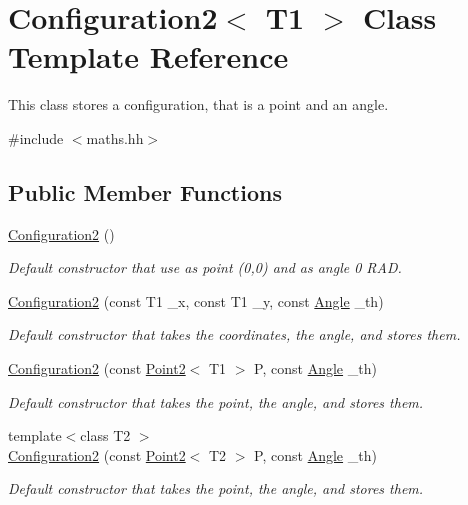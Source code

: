 \hypertarget{class_configuration2}{}\section{Configuration2$<$ T1 $>$ Class Template Reference}
\label{class_configuration2}


This class stores a configuration, that is a point and an angle.  




{\ttfamily \#include $<$maths.\+hh$>$}

\subsection*{Public Member Functions}
\begin{DoxyCompactItemize}
\item 
\mbox{\hyperlink{class_configuration2_a6fc5a5a723da700b6a869db09ec5614f}{Configuration2}} ()
\begin{DoxyCompactList}\small\item\em Default constructor that use as point (0,0) and as angle 0 R\+AD. \end{DoxyCompactList}\item 
\mbox{\hyperlink{class_configuration2_a09e73e9fe2ae9a67a037a0b3d0619047}{Configuration2}} (const T1 \+\_\+x, const T1 \+\_\+y, const \mbox{\hyperlink{class_angle}{Angle}} \+\_\+th)
\begin{DoxyCompactList}\small\item\em Default constructor that takes the coordinates, the angle, and stores them. \end{DoxyCompactList}\item 
\mbox{\hyperlink{class_configuration2_aab6ae19e1f7703bbfd9e1d0be1ca76a5}{Configuration2}} (const \mbox{\hyperlink{class_point2}{Point2}}$<$ T1 $>$ P, const \mbox{\hyperlink{class_angle}{Angle}} \+\_\+th)
\begin{DoxyCompactList}\small\item\em Default constructor that takes the point, the angle, and stores them. \end{DoxyCompactList}\item 
{\footnotesize template$<$class T2 $>$ }\\\mbox{\hyperlink{class_configuration2_a74a634afc5adbd791736cdd4b8c542cb}{Configuration2}} (const \mbox{\hyperlink{class_point2}{Point2}}$<$ T2 $>$ P, const \mbox{\hyperlink{class_angle}{Angle}} \+\_\+th)
\begin{DoxyCompactList}\small\item\em Default constructor that takes the point, the angle, and stores them. \end{DoxyCompactList}\item 

\end{DoxyCompactItemize}
